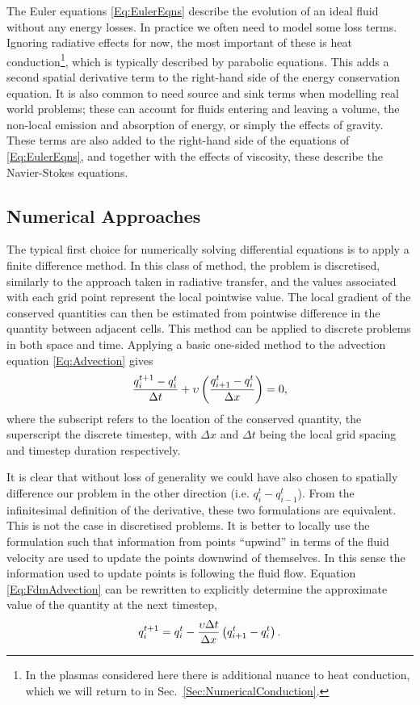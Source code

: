 The Euler equations \eqref{Eq:EulerEqns} describe the evolution of an ideal fluid without any energy losses.
In practice we often need to model some loss terms.
Ignoring radiative effects for now, the most important of these is heat conduction\footnote{In the plasmas considered here there is additional nuance to heat conduction, which we will return to in Sec.~\ref{Sec:NumericalConduction}.}, which is typically described by parabolic equations.
This adds a second spatial derivative term to the right-hand side of the energy conservation equation.
It is also common to need source and sink terms when modelling real world problems; these can account for fluids entering and leaving a volume, the non-local emission and absorption of energy, or simply the effects of gravity.
These terms are also added to the right-hand side of the equations of \eqref{Eq:EulerEqns}, and together with the effects of viscosity, these describe the Navier-Stokes equations.

\subsection{Numerical Approaches}

The typical first choice for numerically solving differential equations is to apply a finite difference method.
In this class of method, the problem is discretised, similarly to the approach taken in radiative transfer, and the values associated with each grid point represent the local pointwise value.
The local gradient of the conserved quantities can then be estimated from pointwise difference in the quantity between adjacent cells.
This method can be applied to discrete problems in both space and time.
Applying a basic one-sided method to the advection equation \eqref{Eq:Advection} gives
\begin{equation}\label{Eq:FdmAdvection}
    \frac{q^{t+1}_i - q^t_i}{\Delta t} + \upsilon \left( \frac{q^t_{i+1} - q^t_i}{\Delta x} \right) = 0,
\end{equation}
where the subscript refers to the location of the conserved quantity, the superscript the discrete timestep, with $\Delta x$ and $\Delta t$ being the local grid spacing and timestep duration respectively.

It is clear that without loss of generality we could have also chosen to spatially difference our problem in the other direction (i.e. $q^t_i - q^t_{i-1}$).
From the infinitesimal definition of the derivative, these two formulations are equivalent.
This is not the case in discretised problems.
It is better to locally use the formulation such that information from points ``upwind'' in terms of the fluid velocity are used to update the points downwind of themselves.
In this sense the information used to update points is following the fluid flow.
Equation \eqref{Eq:FdmAdvection} can be rewritten to explicitly determine the approximate value of the quantity at the next timestep,
\begin{equation}
    q^{t+1}_i = q^t_i - \frac{\upsilon \Delta t}{\Delta x}\left( q^t_{i+1} - q^t_i \right).
\end{equation}

